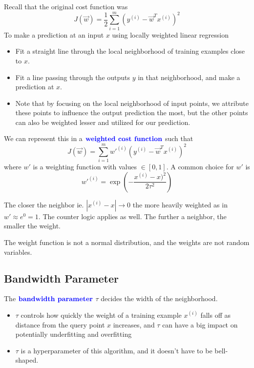 \documentclass[12pt]{scrartcl}
\begin{document}
Recall that the original cost function was
\[J(\vec{w}) = \frac{1}{2}\sum_{i = 1}^m (y^{(i)} - \vec{w}^T x^{(i)})^2\] To make a prediction at an input $x$ using locally weighted linear regression
\begin{itemize}
    \item Fit a straight line through the local neighborhood of training examples close
          to $x$.
    \item Fit a line passing through the outputs $y$ in that neighborhood, and make a
          prediction at $x$.
    \item Note that by focusing on the local neighborhood of input points, we attribute
          these points to influence the output prediction the most, but the other points
          can also be weighted lesser and utilized for our prediction.
\end{itemize}
\begin{definition}
    We can represent this in a $\textbf{\color{blue} weighted cost function}$ such that
    \[J(\vec{w}) = \sum_{i=1}^m w'^{(i)}(y^{(i)} - \vec{w}^Tx^{(i)})^2\]
    where $w'$ is a weighting function with values $\in [0, 1]$. A common choice
    for $w'$ is
    \[w'^{(i)} = \exp(-\frac{x^{(i)} - x)^2}{2\tau^2})\]
\end{definition}
\begin{note}
    The closer the neighbor ie. $|x^{(i)} - x| \to 0$ the more heavily weighted as in $w' \approx e^0 = 1$. The counter logic applies as well. The further a neighbor, the smaller the weight.
\end{note}
\begin{note}
    The weight function is not a normal distribution, and the weights are not random variables.
\end{note}

\subsection{Bandwidth Parameter}

\begin{definition}
    The $\textbf{\color{blue} bandwidth parameter}$ $\tau$ decides the width of the neighborhood.
\end{definition}

\begin{itemize}
    \item $\tau$ controls how quickly the weight of a training example $x^{(i)}$ falls off as distance from the query point $x$ increases, and $\tau$ can have a big impact on potentially underfitting and overfitting
    \item $\tau$ is a hyperparameter of this algorithm, and it doesn't have to be bell-shaped.
\end{itemize}
\end{document}
